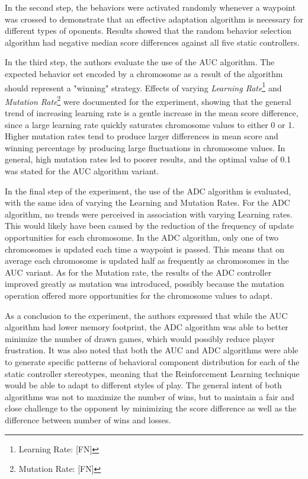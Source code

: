 \documentclass[cic,tc,english]{iiufrgs}
\begin{document}
In the second step, the behaviors were activated randomly whenever a waypoint was crossed to demonstrate that an effective adaptation algorithm is necessary for different types of oponents. Results showed that the random behavior selection algorithm had negative median score differences against all five static controllers.

In the third step, the authors evaluate the use of the AUC algorithm. The expected behavior set encoded by a chromosome as a result of the algorithm should represent a "winning" strategy. Effects of varying \emph{Learning Rate}\footnote{Learning Rate: [FN]} and \emph{Mutation Rate}\footnote{Mutation Rate: [FN]} were documented for the experiment, showing that the general trend of increasing learning rate is a gentle increase in the mean score difference, since a large learning rate quickly saturates chromosome values to either 0 or 1. Higher mutation rates tend to produce larger differences in mean score and winning percentage by producing large fluctuations in chromosome values. In general, high mutation rates led to poorer results, and the optimal value of 0.1 was stated for the AUC algorithm variant.

In the final step of the experiment, the use of the ADC algorithm is evaluated, with the same idea of varying the Learning and Mutation Rates. For the ADC algorithm, no trends were perceived in association with varying Learning rates. This would likely have been caused by the reduction of the frequency of update opportunities for each chromosome. In the ADC algorithm, only one of two chromosomes is updated each time a waypoint is passed. This means that on average each chromosome is updated half as frequently as chromosomes in the AUC variant. As for the Mutation rate, the results of the ADC controller improved greatly as mutation was introduced, possibly because the mutation operation offered more opportunities for the chromosome values to adapt.

As a conclusion to the experiment, the authors expressed that while the AUC algorithm had lower memory footprint, the ADC algorithm was able to better minimize the number of drawn games, which would possibly reduce player frustration. It was also noted that both the AUC and ADC algorithms were able to generate specific patterns of behavioral component distribution for each of the static controller stereotypes, meaning that the Reinforcement Learning technique would be able to adapt to different styles of play. The general intent of both algorithms was not to maximize the number of wins, but to maintain a fair and close challenge to the opponent by minimizing the score difference as well as the difference between number of wins and losses.
\end{document}

